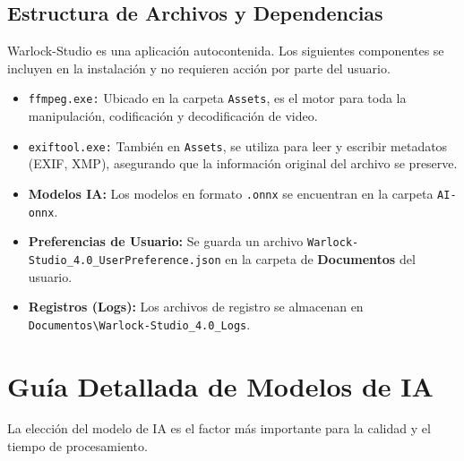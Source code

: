 \documentclass[11pt, a4paper]{article}
\newcommand{\inlinecode}[1]{\colorbox{WarlockLightGray}{\small\texttt{#1}}}
\begin{document}
\subsection{Estructura de Archivos y Dependencias}
\begin{infobox}
Warlock-Studio es una aplicación autocontenida. Los siguientes componentes se incluyen en la instalación y no requieren acción por parte del usuario.
\end{infobox}
\begin{itemize}[leftmargin=*]
    \item \inlinecode{ffmpeg.exe:} Ubicado en la carpeta \texttt{Assets}, es el motor para toda la manipulación, codificación y decodificación de video.
    \item \inlinecode{exiftool.exe:} También en \texttt{Assets}, se utiliza para leer y escribir metadatos (EXIF, XMP), asegurando que la información original del archivo se preserve.
    \item \textbf{Modelos IA:} Los modelos en formato \texttt{.onnx} se encuentran en la carpeta \texttt{AI-onnx}.
    \item \textbf{Preferencias de Usuario:} Se guarda un archivo \inlinecode{Warlock-Studio_4.0_UserPreference.json} en la carpeta de \textbf{Documentos} del usuario.
    \item \textbf{Registros (Logs):} Los archivos de registro se almacenan en \texttt{Documentos\textbackslash Warlock-Studio_4.0_Logs}.
\end{itemize}


\section{Guía Detallada de Modelos de IA}
La elección del modelo de IA es el factor más importante para la calidad y el tiempo de procesamiento.
\end{document}
